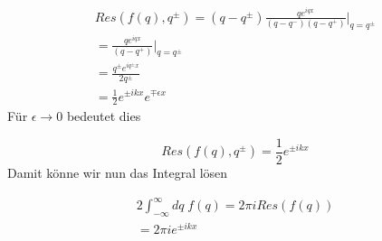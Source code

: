 \begin{align}
Res \left( f \left(q\right) , q^{\pm} \right) = \left( q - q^{\pm} \right)
\frac{q e^{iqx}}{\left(q-q^-\right)\left(q-q^+\right)} \bigg|_{q=q^{\pm}} \\
= \frac{q e^{iqx}}{\left(q-q^+\right)} \bigg|_{q=q^{\pm}} \\
= \frac{q^{\pm}e^{iq^{\pm}x}}{2q^{\pm}} \\
= \frac{1}{2} e^{\pm ikx} e^{\mp \epsilon x}
\end{align}
F\"ur $\epsilon \rightarrow 0$ bedeutet dies

\begin{equation}
Res \left( f \left(q\right) , q^{\pm} \right) = \frac{1}{2} e^{\pm ikx}
\end{equation}
Damit k\"onne wir nun das Integral l\"osen

\begin{align}
2 \int_{-\infty}^{\infty} dq \; f \left(q\right) = 2 \pi i Res \left(f
\left(q\right) \right) \\
= 2 \pi i e^{\pm ikx}
\end{align}
